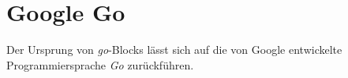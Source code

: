 \section{Google Go}
Der Ursprung von \textit{go}-Blocks lässt sich auf die von Google entwickelte Programmiersprache \textit{Go} zurückführen. 
\acresetall
